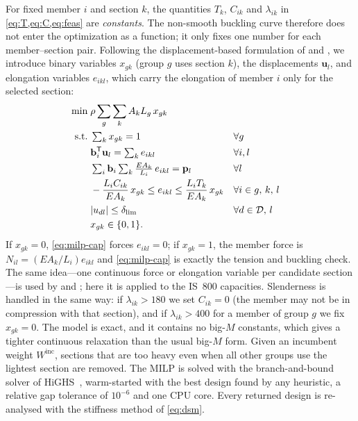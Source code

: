 \documentclass[lineno,pdflatex,sn-mathphys-num]{sn-jnl}
\begin{document}
For fixed member $i$ and section $k$, the quantities $T_k$, $C_{ik}$ and
$\lambda_{ik}$ in \cref{eq:T,eq:C,eq:feas} are \emph{constants}. The non-smooth
buckling curve therefore does not enter the optimization as a function; it only
fixes one number for each member--section pair. Following the
displacement-based formulation of \citet{Rasmussen2008} and \citet{Stolpe2016},
we introduce binary variables $x_{gk}$ (group $g$ uses section $k$), the
displacements $\mathbf{u}_l$, and elongation variables $e_{ikl}$, which carry
the elongation of member $i$ only for the selected section:
\begin{align}
  \min\;& \rho\sum_{g}\sum_{k} A_k L_g\, x_{gk} \label{eq:milp-obj}\\
  \text{s.t.}\;& \textstyle\sum_k x_{gk}=1 && \forall g \label{eq:milp-one}\\
  & \mathbf{b}_i^{\mathsf T}\mathbf{u}_l=\textstyle\sum_k e_{ikl} && \forall i,l \label{eq:milp-comp}\\
  & \textstyle\sum_i \mathbf{b}_i \sum_k \frac{EA_k}{L_i}\, e_{ikl}=\mathbf{p}_l && \forall l \label{eq:milp-eq}\\
  & -\frac{L_i C_{ik}}{EA_k}\,x_{gk}\le e_{ikl}\le \frac{L_i T_k}{EA_k}\,x_{gk} && \forall i\in g,\,k,\,l \label{eq:milp-cap}\\
  & |u_{dl}|\le\delta_{\mathrm{lim}} && \forall d\in\mathcal D,\, l \label{eq:milp-disp}\\
  & x_{gk}\in\{0,1\}. \notag
\end{align}
If $x_{gk}=0$, \cref{eq:milp-cap} forces $e_{ikl}=0$; if $x_{gk}=1$, the member
force is $N_{il}=(EA_k/L_i)e_{ikl}$ and \cref{eq:milp-cap} is exactly the
tension and buckling check. The same idea---one continuous force or
elongation variable per candidate section---is used by \citet{Mela2014} and
\citet{VanMellaert2018}; here it is applied to the IS~800 capacities.
Slenderness is handled in the same way: if
$\lambda_{ik}>180$ we set $C_{ik}=0$ (the member may not be in compression with
that section), and if $\lambda_{ik}>400$ for a member of group $g$ we fix
$x_{gk}=0$. The model is exact, and it contains no big-$M$ constants, which
gives a tighter continuous relaxation than the usual big-$M$ form. Given an
incumbent weight $W^{\mathrm{inc}}$, sections that are too
heavy even when all other groups use the lightest section are removed.
The MILP is solved with the branch-and-bound solver of HiGHS~\citep{Huangfu2018},
warm-started with the best design found by any heuristic, a relative gap tolerance of
$10^{-6}$ and one CPU core. Every returned design is re-analysed with the
stiffness method of \cref{eq:dsm}.
\end{document}
